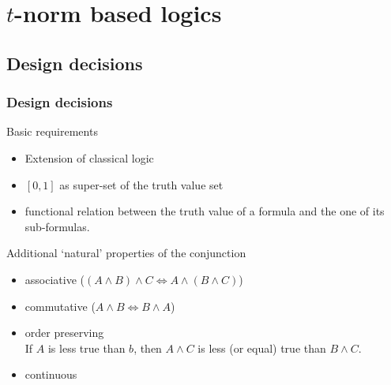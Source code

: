 \documentclass[aspectratio=169]%
  {beamer}
\begin{document}
\section{$t$-norm based logics}
\subsection{Design decisions}
\begin{frame}
  \frametitle{Design decisions}

  \begin{block}{Basic requirements}
    \begin{itemize}
    \item Extension of classical logic
    \item $[0,1]$ as super-set of the truth value set
    \item functional relation between the truth value of a formula and
      the one of its sub-formulas.
    \end{itemize}
  \end{block}

  \pause
  \begin{block}{Additional `natural' properties of the conjunction}
    \begin{itemize}
    \item associative ($(A\land B)\land C \Leftrightarrow A\land(B\land
      C)$) 
    \item commutative ($A\land B \Leftrightarrow B\land A$)
    \item order preserving\\ 
      If $A$ is less true than $b$, then $A\land C$ is less (or equal)
      true than $B\land C$.
    \item continuous
    \end{itemize}
  \end{block}
\end{frame}
\end{document}
